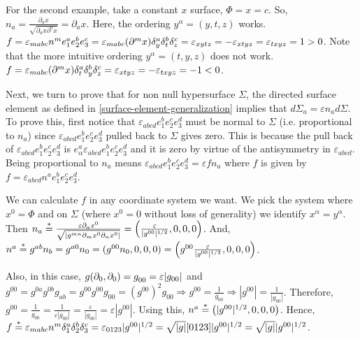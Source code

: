 For the second example, take a constant $x$ surface, $\Phi = x= c$. So, $ n_a = \frac{\partial_a x}{\sqrt{\partial_a x \partial^a x}} = \partial_a x$. Here, the ordering $y^\alpha = (y,t,z)$ works. $f = \varepsilon_{mabc} n^m e^a_1 e^b_2 e^c_3 = \varepsilon_{mabc} (\partial^m x) \delta^{a}_{y} \delta^{b}_{t} \delta^{c}_{z} = \varepsilon_{xytz} = -\varepsilon_{xtyz} = \varepsilon_{txyz} = 1 > 0$. Note that the more intuitive ordering $y^\alpha = (t,y,z)$ does not work. $f = \varepsilon_{mabc} (\partial^m x) \delta^{a}_{t} \delta^{b}_{y} \delta^{c}_{z} = \varepsilon_{xtyz} = -\varepsilon_{txyz} = -1<0$. 

Next, we turn to prove that for non null hypersurface $ \Sigma$, the directed surface element as defined in \cref{surface-element-generalization} implies that $d\Sigma_a = \varepsilon n_a d\Sigma$. To prove this, first notice that $\varepsilon_{abcd} e^b_1 e^c_2 e^d_3$ must be normal to $ \Sigma$ (i.e. proportional to $n_a$) since $\varepsilon_{abcd} e^b_1 e^c_2 e^d_3$ pulled back to $\Sigma$ gives zero. This is because the pull back of $\varepsilon_{abcd} e^b_1 e^c_2 e^d_3$ is $ e^a_\alpha \varepsilon_{abcd} e^b_1 e^c_2 e^d_3$ and it is zero by virtue of the antisymmetry in $\varepsilon_{abcd}$. Being proportional to $n_a$ means $ \varepsilon_{abcd} e^b_1 e^c_2 e^d_3 = \varepsilon f n_a $ where $ f $ is given by $ f = \varepsilon_{abcd} n^a e^b_1 e^c_2 e^d_3$.

We can calculate $f$ in any coordinate system we want. We pick the system where $x^0 = \Phi$ and on $\Sigma$ (where $x^0 = 0$ without loss of generality) we identify $x^\alpha = y^\alpha$. Then $n_a \overset{*}{=} \frac{\varepsilon \partial_a x^0}{\sqrt{|g^{mn} \partial_m x^0 \partial_n x^0|}} = \left( \frac{\varepsilon}{|g^{00}|^{1/2}}, 0, 0, 0 \right)$. And, $n^a \overset{*}= g^{ab} n_b = g^{a0} n_0=(g^{00} n_0, 0, 0, 0)= \left( g^{00} \frac{\varepsilon}{|g^{00}|^{1/2}}, 0, 0, 0 \right)$.

Also, in this case, $g(\partial_0, \partial_0) = \tt{g}{}{00} = \varepsilon |g_{00}|$ and $g^{00} = g^{0a} g^{0b} g_{ab}= g^{00} g^{00} g_{00} = (g^{00})^2 g_{00} \Rightarrow g^{00} = \frac{1}{g_{00}} \Rightarrow |g^{00}| = \frac{1}{|g_{00}|}$. Therefore, $g^{00} = \frac{1}{g_{00}} = \frac{1}{\varepsilon |g_{00}|} = \frac{\varepsilon}{|g_{00}|} = \varepsilon |g^{00}|$. Using this, $n^a \overset{*}{=} \left( |g^{00}|^{1/2}, 0, 0, 0 \right)$. Hence, $f \overset{*}{=} \varepsilon_{mabc} n^m \delta^{a}_{1} \delta^{b}_{2} \delta^{c}_{3}= \varepsilon_{0123} |g^{00}|^{1/2} = \sqrt{|g|} [0123] |g^{00}|^{1/2} = \sqrt{|g|} |g^{00}|^{1/2}$.


